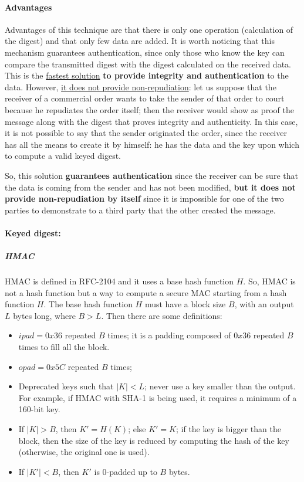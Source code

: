 \paragraph{Advantages}
Advantages of this technique are that there is only one operation (calculation of the digest) and that only few data are added. It is worth noticing that this mechanism guarantees authentication, since only those who know the key can compare the transmitted digest with the digest calculated on the received data. This is the \underline{fastest solution} \textbf{to provide integrity and authentication} to the data. However, \underline{it does not provide non-repudiation}: let us suppose that the receiver of a commercial order wants to take the sender of that order to court because he repudiates the order itself; then the receiver would show as proof the message along with the digest that proves integrity and authenticity. In this case, it is not possible to say that the sender originated the order, since the receiver has all the means to create it by himself: he has the data and the key upon which to compute a valid keyed digest.

So, this solution \textbf{guarantees authentication} since the receiver can be sure that the data is coming from the sender and has not been modified, \textbf{but it does not provide non-repudiation by itself} since it is impossible for one of the two parties to demonstrate to a third party that the other created the message.


\paragraph{Keyed digest:}

\subparagraph{HMAC}
HMAC is defined in RFC-2104 and it uses a base hash function \(H\). So, HMAC is not a hash function but a way to compute a secure MAC starting from a hash function \(H\). The base hash function \(H\) must have a block size \(B\), with an output \(L\) bytes long, where \(B > L\). Then there are some definitions:
\begin{itemize}
    \item \(ipad = 0x36\) repeated \(B\) times; it is a padding composed of \(0x36\) repeated \(B\) times to fill all the block.
    \item \(opad = 0x5C\) repeated \(B\) times;
    \item Deprecated keys such that \(|K| < L\); never use a key smaller than the output. For example, if HMAC with SHA-1 is being used, it requires a minimum of a 160-bit key.
    \item If \(|K| > B\), then \(K' = H(K)\); else \(K' = K\); if the key is bigger than the block, then the size of the key is reduced by computing the hash of the key (otherwise, the original one is used).
    \item If \(|K'| < B\), then \(K'\) is 0-padded up to \(B\) bytes.
\end{itemize}

